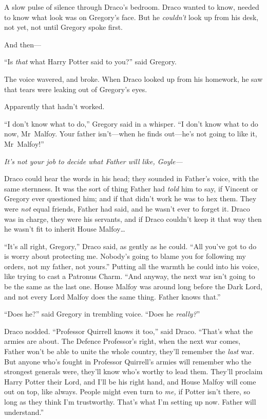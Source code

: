 A slow pulse of silence through Draco’s bedroom. Draco wanted to know, needed
to know what look was on Gregory’s face. But he \emph{couldn’t} look up from
his desk, not yet, not until Gregory spoke first.

And then—

“Is \emph{that} what Harry Potter said to you?” said Gregory.

The voice wavered, and broke. When Draco looked up from his homework, he saw
that tears were leaking out of Gregory’s eyes.

Apparently that hadn’t worked.

“I don’t know what to do,” Gregory said in a whisper. “I don’t know what to do
now, Mr~Malfoy. Your father isn’t—when he finds out—he’s not going to like
it, Mr~Malfoy!”

\emph{It’s not \emph{your} job to decide what Father will like, Goyle—}

Draco could hear the words in his head; they sounded in Father’s voice, with
the same sternness. It was the sort of thing Father had \emph{told} him to say,
if Vincent or Gregory ever questioned him; and if that didn’t work he was to
hex them. They were \emph{not} equal friends, Father had said, and he wasn’t
ever to forget it. Draco was in charge, they were his servants, and if Draco
couldn’t keep it that way then he wasn’t fit to inherit House Malfoy…

“It’s all right, Gregory,” Draco said, as gently as he could. “All you’ve got
to do is worry about protecting me. Nobody’s going to blame you for following
my orders, not my father, not yours.” Putting all the warmth he could into his
voice, like trying to cast a Patronus Charm. “And anyway, the next war isn’t
going to be the same as the last one. House Malfoy was around long before the
Dark Lord, and not every Lord Malfoy does the same thing. Father knows that.”

“Does he?” said Gregory in trembling voice. “Does he \emph{really?}”

Draco nodded. “Professor Quirrell knows it too,” said Draco. “That’s what the
armies are about. The Defence Professor’s right, when the next war comes,
Father won’t be able to unite the whole country, they’ll remember the
\emph{last} war. But anyone who’s fought in Professor Quirrell’s armies will
remember who the strongest generals were, they’ll know who’s worthy to lead
them. They’ll proclaim Harry Potter their Lord, and I’ll be his right hand, and
House Malfoy will come out on top, like always. People might even turn to
\emph{me,} if Potter isn’t there, so long as they think I’m trustworthy. That’s
what I’m setting up now. Father will understand.”

